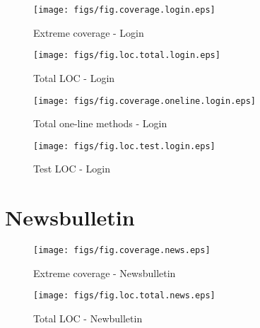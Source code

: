 \begin{figure}[htbp]
  \begin{minipage}[htbp]{.45\linewidth}
    \begin{center}
      \texttt{[image: figs/fig.coverage.login.eps]}
      \caption{Extreme coverage - Login}
      \label{fig:coverage.login}
    \end{center}
  \end{minipage}
\hfill
  \begin{minipage}[htbp]{.45\linewidth}
    \begin{center}
      \texttt{[image: figs/fig.loc.total.login.eps]}
      \caption{Total LOC - Login}
      \label{fig:loc.total.login}
    \end{center}
  \end{minipage}
\end{figure}

\begin{figure}[htbp]
  \begin{minipage}[htbp]{.45\linewidth}
    \begin{center}
      \texttt{[image: figs/fig.coverage.oneline.login.eps]}
      \caption{Total one-line methods - Login}
      \label{fig:coverage.oneline.test.login}
    \end{center}
  \end{minipage}
\hfill
  \begin{minipage}[htbp]{.45\linewidth}
    \begin{center}
      \texttt{[image: figs/fig.loc.test.login.eps]}
      \caption{Test LOC - Login}
      \label{fig:loc.test.login}
    \end{center}
  \end{minipage}
\end{figure}

\clearpage


\section {Newsbulletin}

\begin{figure}[htbp]
  \begin{minipage}[htbp]{.45\linewidth}
    \begin{center}
      \texttt{[image: figs/fig.coverage.news.eps]}
      \caption{Extreme coverage - Newsbulletin}
      \label{fig:coverage.news}
    \end{center}
  \end{minipage}
\hfill
  \begin{minipage}[htbp]{.45\linewidth}
    \begin{center}
      \texttt{[image: figs/fig.loc.total.news.eps]}
      \caption{Total LOC - Newbulletin}
      \label{fig:loc.total.news}
    \end{center}
  \end{minipage}
\end{figure}

